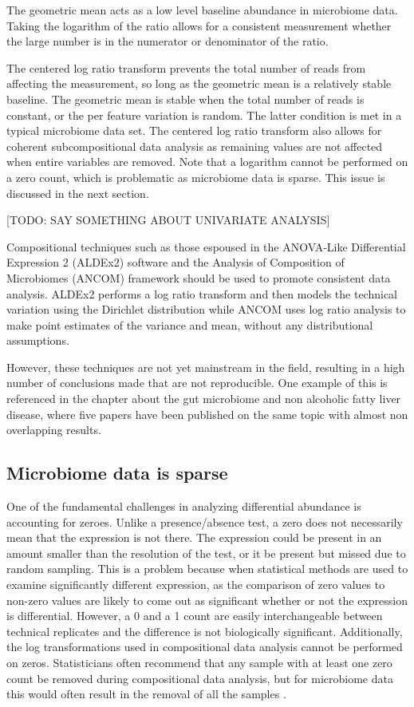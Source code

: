 The geometric mean acts as a low level baseline abundance in microbiome data. Taking the logarithm of the ratio allows for a consistent measurement whether the large number is in the numerator or denominator of the ratio.

The centered log ratio transform prevents the total number of reads from affecting the measurement, so long as the geometric mean is a relatively stable baseline. The geometric mean is stable when the total number of reads is constant, or the per feature variation is random. The latter condition is met in a typical microbiome data set. The centered log ratio transform also allows for coherent subcompositional data analysis as remaining values are not affected when entire variables are removed. Note that a logarithm cannot be performed on a zero count, which is problematic as microbiome data is sparse. This issue is discussed in the next section.

[TODO: SAY SOMETHING ABOUT UNIVARIATE ANALYSIS]

Compositional techniques such as those espoused in the ANOVA-Like Differential Expression 2 (ALDEx2) software \cite{fernandes2014unifying} and the Analysis of Composition of Microbiomes (ANCOM) framework \cite{mandal2015analysis} should be used to promote consistent data analysis. ALDEx2 performs a log ratio transform and then models the technical variation using the Dirichlet distribution while ANCOM uses log ratio analysis to make point estimates of the variance and mean, without any distributional assumptions.

However, these techniques are not yet mainstream in the field, resulting in a high number of conclusions made that are not reproducible. One example of this is referenced in the chapter about the gut microbiome and non alcoholic fatty liver disease, where five papers have been published on the same topic with almost non overlapping results.

\subsection{Microbiome data is sparse}
One of the fundamental challenges in analyzing differential abundance is accounting for zeroes. Unlike a presence/absence test, a zero does not necessarily mean that the expression is not there. The expression could be present in an amount smaller than the resolution of the test, or it be present but missed due to random sampling. This is a problem because when statistical methods are used to examine significantly different expression, as the comparison of zero values to non-zero values are likely to come out as significant whether or not the expression is differential. However, a 0 and a 1 count are easily interchangeable between technical replicates and the difference is not biologically significant. Additionally, the log transformations used in compositional data analysis cannot be performed on zeros. Statisticians often recommend that any sample with at least one zero count be removed during compositional data analysis, but for microbiome data this would often result in the removal of all the samples \cite{aitchison1982statistical}.

